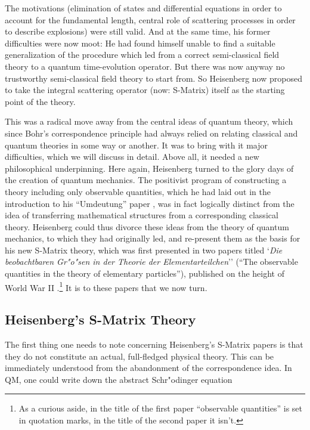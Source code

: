 \documentclass[12pt,a4paper]{article}
\begin{document}
The motivations (elimination of states and differential equations in order to account for the fundamental length, central role of scattering processes in order to describe explosions) were still valid. And at the same time, his former difficulties were now moot: He had found himself unable to find a suitable generalization of the procedure which led from a correct semi-classical field theory to a quantum time-evolution operator. But there was now anyway no trustworthy semi-classical field theory to start from. So Heisenberg now proposed to take the integral scattering operator (now: S-Matrix) itself as the starting point of the theory.

This was a radical move away from the central ideas of quantum theory, which since Bohr's correspondence principle had always relied on relating classical and quantum theories in some way or another. It was to bring with it major difficulties, which we will discuss in detail. Above all, it needed a new philosophical underpinning. Here again, Heisenberg turned to the glory days of the creation of quantum mechanics. The positivist program of constructing a theory including only observable quantities, which he had laid out in the introduction to his ``Umdeutung'' paper \citep{heisenberg_1925_umdeutung}, was in fact logically distinct from the idea of transferring mathematical structures from a corresponding classical theory. Heisenberg could thus divorce these ideas from the theory of quantum mechanics, to which they had originally led, and re-present them as the basis for his new S-Matrix theory, which was first presented in two papers titled `\emph{Die beobachtbaren Gr"o"sen in der Theorie der Elementarteilchen}'' (``The observable quantities in the theory of elementary particles''), published on the height of World War II \citep{heisenberg_1943_die-beobachtbaren, heisenberg_1943_die-beobachtbarenb}.\footnote{As a curious aside, in the title of the first paper ``observable quantities'' is set in quotation marks, in the title of the second paper it isn't.} It is to these papers that we now turn.

\subsection{Heisenberg's S-Matrix Theory}

The first thing one needs to note concerning Heisenberg's S-Matrix papers is that they do not constitute an actual, full-fledged physical theory. This can be immediately understood from the abandonment of the correspondence idea. In QM, one could write down the abstract Schr"odinger equation
\end{document}
